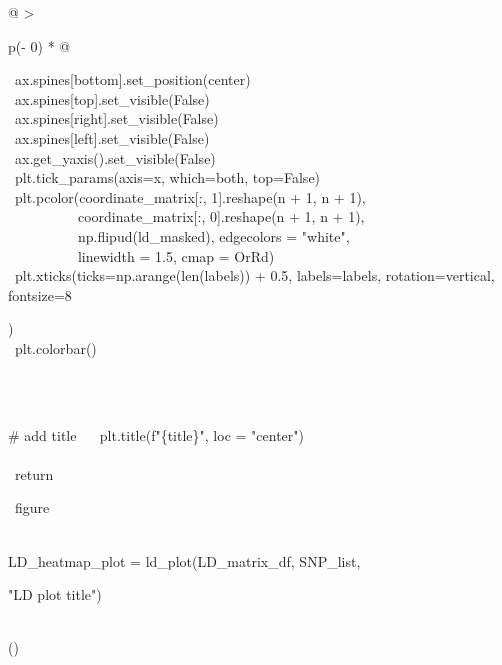 \documentclass[12pt,a4paper]{article}
\begin{document}
\begin{longtable}[]{@{}
  >{\raggedright\arraybackslash}p{(\columnwidth - 0\tabcolsep) * }@{}}
\begin{minipage}[t]{\linewidth}
{~ax.spines{[}}{\textquotesingle bottom\textquotesingle{}}{{]}.set\_position(}{\textquotesingle center\textquotesingle{}}{)\\
\hspace*{0.333em}
~ax.spines{[}}{\textquotesingle top\textquotesingle{}}{{]}.set\_visible(}{False}{)\\
\hspace*{0.333em}
~ax.spines{[}}{\textquotesingle right\textquotesingle{}}{{]}.set\_visible(}{False}{)\\
\hspace*{0.333em}
~ax.spines{[}}{\textquotesingle left\textquotesingle{}}{{]}.set\_visible(}{False}{)\\
\hspace*{0.333em} ~ax.get\_yaxis().set\_visible(}{False}{)\\
\hspace*{0.333em}
~plt.tick\_params(axis=}{\textquotesingle x\textquotesingle{}}{,
which=}{\textquotesingle both\textquotesingle{}}{, top=}{False}{)\\
\hspace*{0.333em} ~plt.pcolor(coordinate\_matrix{[}:, }{1}{{]}.reshape(n
+ }{1}{, n + }{1}{),\\
\hspace*{0.333em} ~ ~ ~ ~ ~ ~ coordinate\_matrix{[}:, }{0}{{]}.reshape(n
+ }{1}{, n + }{1}{),\\
\hspace*{0.333em} ~ ~ ~ ~ ~ ~ np.flipud(ld\_masked), edgecolors =
}{"white"}{,\\
\hspace*{0.333em} ~ ~ ~ ~ ~ ~ linewidth = }{1.5}{, cmap =
}{\textquotesingle OrRd\textquotesingle{}}{)\\
\hspace*{0.333em} ~plt.xticks(ticks=np.arange(len(labels)) + }{0.5}{,
labels=labels, rotation=}{\textquotesingle vertical\textquotesingle{}}{,
fontsize=}{8}{)\\
\hspace*{0.333em} ~plt.colorbar()\\
\strut \\
\hspace*{0.333em} ~}{\# add title}{\hfill\break
~ ~plt.title(}{f"\{title\}"}{, loc = }{"center"}{)\\
\hspace*{0.333em}\\
\hspace*{0.333em} ~}{return}{~figure\\
\strut \\
LD\_heatmap\_plot = ld\_plot(LD\_matrix\_df, SNP\_list, }{"LD plot
title"}{)}\strut
\end{minipage} \\
\bottomrule()
\end{longtable}
\end{document}
